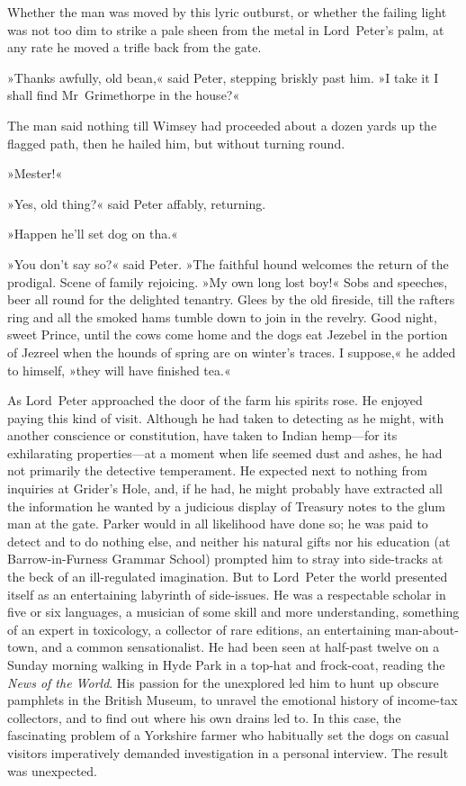 Whether the man was moved by this lyric outburst, or whether the failing light was not too dim to strike a pale sheen from the metal in Lord~Peter's palm, at any rate he moved a trifle back from the gate.

»Thanks awfully, old bean,« said Peter, stepping briskly past him. »I take it I shall find Mr~Grimethorpe in the house?«

The man said nothing till Wimsey had proceeded about a dozen yards up the flagged path, then he hailed him, but without turning round.

»Mester!«

»Yes, old thing?« said Peter affably, returning.

»Happen he'll set dog on tha.«

»You don't say so?« said Peter. »The faithful hound welcomes the return of the prodigal. Scene of family rejoicing. »My own long lost boy!« Sobs and speeches, beer all round for the delighted tenantry. Glees by the old fireside, till the rafters ring and all the smoked hams tumble down to join in the revelry. Good night, sweet Prince, until the cows come home and the dogs eat Jezebel in the portion of Jezreel when the hounds of spring are on winter's traces. I suppose,« he added to himself, »they will have finished tea.«

As Lord~Peter approached the door of the farm his spirits rose. He enjoyed paying this kind of visit. Although he had taken to detecting as he might, with another conscience or constitution, have taken to Indian hemp—for its exhilarating properties—at a moment when life seemed dust and ashes, he had not primarily the detective temperament.  He expected next to nothing from inquiries at Grider's Hole, and, if he had, he might probably have extracted all the information he wanted by a judicious display of Treasury notes to the glum man at the gate. Parker would in all likelihood have done so; he was paid to detect and to do nothing else, and neither his natural gifts nor his education (at Barrow-in-Furness Grammar School) prompted him to stray into side-tracks at the beck of an ill-regulated imagination. But to Lord~Peter the world presented itself as an entertaining labyrinth of side-issues. He was a respectable scholar in five or six languages, a musician of some skill and more understanding, something of an expert in toxicology, a collector of rare editions, an entertaining man-about-town, and a common sensationalist. He had been seen at half-past twelve on a Sunday morning walking in Hyde Park in a top-hat and frock-coat, reading the \textit{News of the World}. His passion for the unexplored led him to hunt up obscure pamphlets in the British Museum, to unravel the emotional history of income-tax collectors, and to find out where his own drains led to. In this case, the fascinating problem of a Yorkshire farmer who habitually set the dogs on casual visitors imperatively demanded investigation in a personal interview. The result was unexpected.

